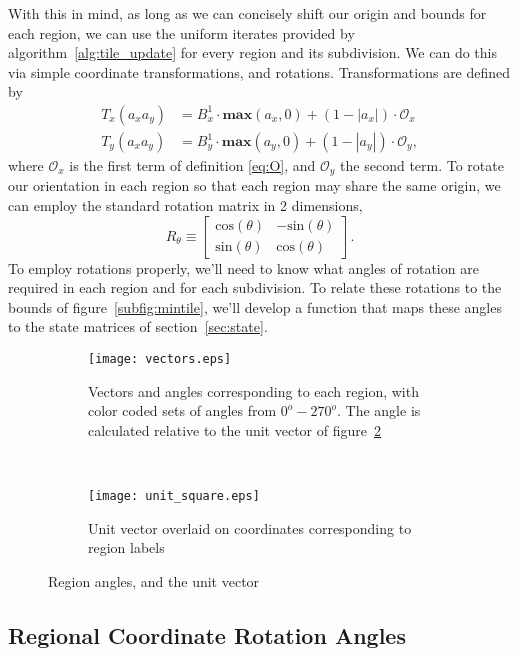 With this in mind, as long as we can concisely shift our origin
and bounds for each region, we can use the
uniform iterates provided by algorithm~\ref{alg:tile_update} for
every region and its subdivision.
We can do this via simple coordinate transformations,
and rotations.  Transformations are defined by
\begin{eqnarray}
  T_x(a_xa_y) &= B_x^1 \cdot \mathbf{max}(a_x,0) + (1 - |a_x|) \cdot \mathcal{O}_x\\
  T_y(a_xa_y) &= B_y^1 \cdot \mathbf{max}(a_y,0) + (1 - |a_y|) \cdot \mathcal{O}_y,
  \label{eq:transforms}
\end{eqnarray}
where $\mathcal{O}_x$ is the first term of definition \ref{eq:O}, and $\mathcal{O}_y$ the second term.  To
rotate our orientation in each region so that each region may share the same origin, we can employ the
standard rotation matrix in 2 dimensions,
\begin{equation}
  R_{\theta} \equiv \begin{bmatrix}
    \text{cos} (\theta) & - \text{sin}(\theta) \\
    \text{sin}(\theta) & \text{cos}(\theta)
    \end{bmatrix}.
\end{equation}
To employ rotations properly, we'll need to know what angles
of rotation are required in each region and for each subdivision.
  To relate these rotations to the bounds of
figure~\ref{subfig:mintile}, we'll develop a function
that maps these angles to the state matrices of
section~\ref{sec:state}.
\begin{figure}[h]
  \centering
  \begin{subfigure}[h]{.4\textwidth}
    \centering
    \texttt{[image: vectors.eps]}
    \caption{Vectors and angles corresponding to each
    region, with color coded sets of angles from $0^o - 270^o$.  The
    angle is calculated relative to the unit vector of
    figure~\ref{subfig:unit}}
    \label{subfig:all_vectors}
  \end{subfigure}
  ~
  \begin{subfigure}[h]{.3\textwidth}
    \centering
    \texttt{[image: unit\_square.eps]}
    \caption{Unit vector overlaid on coordinates
    corresponding to region labels}
    \label{subfig:unit}
    \end{subfigure}
  \caption{Region angles, and the unit vector}
  \label{fig:vectors}
\end{figure}

\subsection{Regional Coordinate Rotation Angles}

